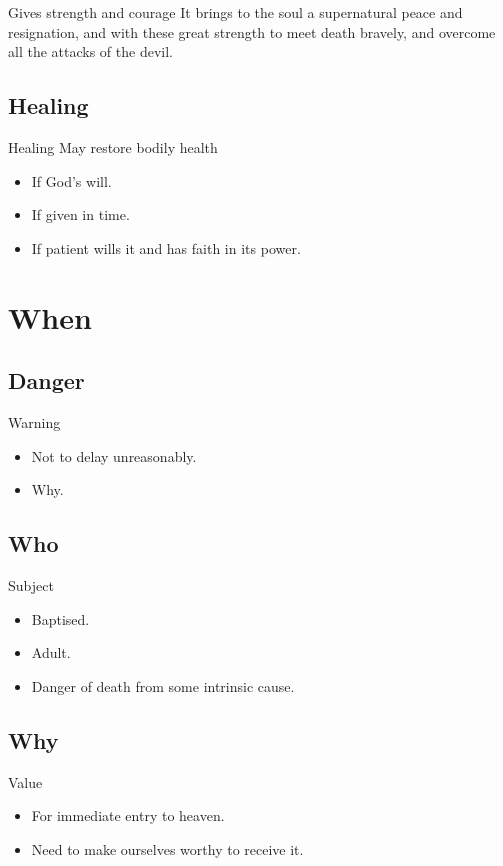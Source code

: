 \documentclass{beamer}
\begin{document}
\begin{frame}{Gives strength and courage}
It brings to the soul  a  supernatural  peace  and
resignation, and with these  great  strength  to  meet  death  bravely,  and
overcome all the attacks of the devil.
\end{frame}

\subsection{Healing}

\begin{frame}{Healing}
May restore bodily health
\begin{itemize}
\item If God's will.
\item  If given in time.
\item    If patient wills it and has faith in its power.
\end{itemize}
\end{frame}

\section{When}

\subsection{Danger}

\begin{frame}{Warning}
\begin{itemize}
 \item Not to delay unreasonably.
 \item Why.
\end{itemize}
\end{frame}

\subsection{Who}

\begin{frame}{Subject}
\begin{itemize}
 \item Baptised.
 \item Adult.
 \item Danger of death from some intrinsic cause.
\end{itemize}
\end{frame}

\subsection{Why}

\begin{frame}{Value}
\begin{itemize}
 \item For immediate entry to heaven.
 \item Need to make ourselves worthy to receive it.
 \end{itemize}
\end{frame}

   
\end{document}
